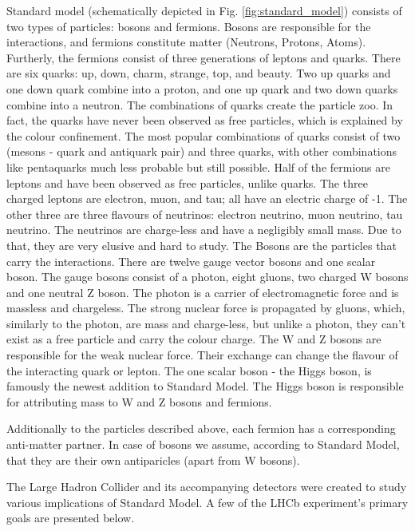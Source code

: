 Standard model (schematically depicted in Fig. \ref{fig:standard_model}) consists of two types of particles: bosons and fermions. Bosons are responsible for the interactions, and fermions constitute matter (Neutrons, Protons, Atoms).
Furtherly, the fermions consist of three generations of leptons and quarks.
There are six quarks: up, down, charm, strange, top, and beauty. Two up quarks and one down quark combine into a proton, and one up quark and two down quarks combine into a neutron.
The combinations of quarks create the particle zoo. In fact, the quarks have never been observed as free particles, which is explained by the colour confinement.
The most popular combinations of quarks consist of two (mesons - quark and antiquark pair) and three quarks, with other combinations like pentaquarks much less probable but still possible.
Half of the fermions are leptons and have been observed as free particles, unlike quarks. The three charged leptons are electron, muon, and tau; all have an electric charge of -1.
The other three are three flavours of neutrinos: electron neutrino, muon neutrino, tau neutrino.
The neutrinos are charge-less and have a negligibly small mass. Due to that, they are very elusive and hard to study.
The Bosons are the particles that carry the interactions. There are twelve gauge vector bosons and one scalar boson.
The gauge bosons consist of a photon, eight gluons, two charged W bosons and one neutral Z boson.
The photon is a carrier of electromagnetic force and is massless and chargeless.
The strong nuclear force is propagated by gluons, which, similarly to the photon, are mass and charge-less, but unlike a photon, they can't exist as a free particle and carry the colour charge.
The W and Z bosons are responsible for the weak nuclear force.
Their exchange can change the flavour of the interacting quark or lepton.
The one scalar boson - the Higgs boson, is famously the newest addition to Standard Model.
The Higgs boson is responsible for attributing mass to W and Z bosons and fermions.

Additionally to the particles described above, each fermion has a corresponding anti-matter partner. In case of bosons we assume, according to Standard Model, that they are their own antiparicles (apart from W bosons).

The Large Hadron Collider and its accompanying detectors were created to study various implications of Standard Model. A few of the LHCb experiment's primary goals are presented below.


